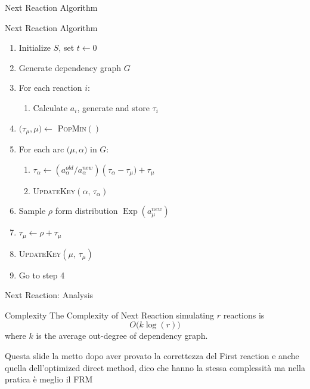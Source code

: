 \documentclass{beamer}
\DeclareMathOperator{\Exp}{\text{Exp}}
\begin{document}
\begin{frame}{Next Reaction Algorithm}
  \begin{block}{Next Reaction Algorithm}
    \begin{enumerate}
    \item Initialize $S$, set $t\leftarrow 0$
    \item Generate dependency graph $G$
    \item For each reaction $i$:
      \begin{enumerate}
      \item Calculate $a_i$, generate and store $\tau_i$
      \end{enumerate}
    \item $\bigl(\tau_\mu, \mu\bigr) \leftarrow$ \textsc{PopMin}$()$
    \item For each arc $\bigl(\mu, \alpha\bigr)$ in $G$:
      \begin{enumerate}
      \item $\tau_\alpha \leftarrow \left(a^{old}_\alpha \big/ a^{new}_\alpha\right)
        \left(\tau_\alpha - \tau_\mu) + \tau_\mu$
      \item \textsc{UpdateKey}$\left(\alpha, \, \tau_\alpha\right)$
      \end{enumerate}
    \item Sample $\rho$ form distribution $\Exp\left(a^{new}_\mu\right)$
    \item $\tau_\mu \leftarrow \rho + \tau_\mu$
    \item \textsc{UpdateKey}$\left(\mu, \, \tau_\mu\right)$
    \item Go to step 4
    \end{enumerate}
  \end{block}
\end{frame}



\begin{frame}{Next Reaction: Analysis}
  \begin{block}{Complexity}
    The Complexity of Next Reaction simulating $r$ reactions is
    $$ O\bigl(k \log(r)\bigr) $$
    where $k$ is the average out-degree of dependency graph.    
  \end{block}
  Questa slide la metto dopo aver provato la correttezza del First reaction e anche quella
  dell'optimized direct method, dico che hanno la stessa complessità ma nella pratica è meglio il FRM
\end{frame}
\end{document}
